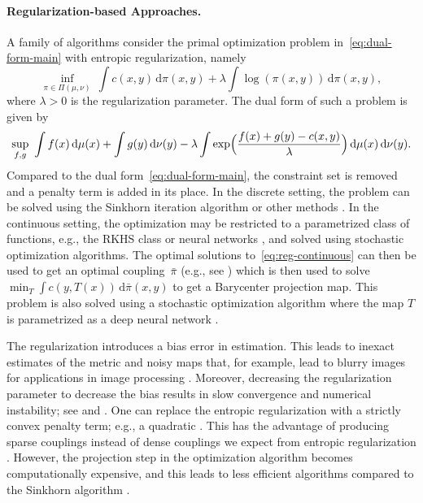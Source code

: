 \documentclass[10pt]{article}
\newcommand{\ud}{\,\mathrm{d}}
\numberwithin{equation}{section}
\begin{document}
\paragraph{Regularization-based Approaches.} %
A family of algorithms consider the primal optimization problem in~\eqref{eq:dual-form-main} with entropic regularization, namely 
\begin{equation*}
\inf_{\pi \in \Pi(\mu,\nu)}~ \int c(x,y)\ud \pi(x,y) + \lambda \int \log(\pi(x,y)) \ud \pi(x,y),
\end{equation*} 
where $\lambda >0$ is the regularization parameter. The dual form of such a problem is given by 
\begin{align}\label{eq:reg-continuous}
\sup_{f,g}~\int f(x) \ud \mu(x) + \int g(y)\ud \nu(y) - \lambda \int \exp\Bigl(\frac{f(x)+g(y) - c(x,y)}{\lambda} \Bigr) \ud\mu(x) \ud \nu(y) .
\end{align}
Compared to the dual form~\eqref{eq:dual-form-main}, the constraint set is removed and a penalty term is added in its place. In the discrete setting, the problem can be solved using the Sinkhorn iteration algorithm or other methods \citep{cuturi2013sinkhorn,dvurechensky2018computational}. In the continuous setting, the optimization may be restricted to a parametrized class of functions, e.g., the RKHS class \citep{genevay2016stochastic} or neural networks \citep{seguy2017large}, and solved using stochastic optimization algorithms. The optimal solutions to~\eqref{eq:reg-continuous} can then be used to get an optimal coupling~$\bar{\pi}$ (e.g., see \citet[Proposition 2.1]{genevay2016stochastic}) which is then used to solve $\min_T\int c(y,T(x))\ud \bar{\pi}(x,y)$ to get a Barycenter projection map. This problem is also solved using a stochastic optimization algorithm where the map $T$ is parametrized as a deep neural network \citep{seguy2017large}. 

The regularization introduces a bias error in estimation. This leads to inexact estimates of the metric and noisy maps that, for example, lead to blurry images for applications in image processing \citep{essid2018quadratically,blondel2017smooth}. Moreover, decreasing the regularization parameter to decrease the bias results in slow convergence and numerical instability; see \citet{schmitzer2016stabilized,dvurechensky2018computational} and \citet[Remark~4.6]{peyre2017computational}. One can replace the entropic regularization with a strictly convex penalty term; e.g., a quadratic \citep{essid2018quadratically}. This has the advantage of producing sparse couplings instead of dense couplings we expect from entropic regularization \citep{blondel2017smooth}. However, the projection step in the optimization algorithm becomes computationally expensive, and this leads to less efficient algorithms compared to the Sinkhorn algorithm \cite[Remark 4.8]{peyre2017computational}.
\end{document}
